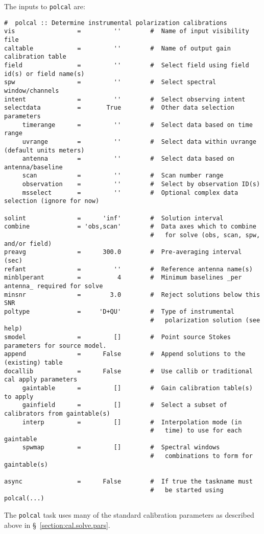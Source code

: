 The inputs to {\tt polcal} are:
\small
\begin{verbatim}
#  polcal :: Determine instrumental polarization calibrations
vis                 =         ''        #  Name of input visibility file
caltable            =         ''        #  Name of output gain calibration table
field               =         ''        #  Select field using field id(s) or field name(s)
spw                 =         ''        #  Select spectral window/channels
intent              =         ''        #  Select observing intent
selectdata          =       True        #  Other data selection parameters
     timerange      =         ''        #  Select data based on time range
     uvrange        =         ''        #  Select data within uvrange (default units meters)
     antenna        =         ''        #  Select data based on antenna/baseline
     scan           =         ''        #  Scan number range
     observation    =         ''        #  Select by observation ID(s)
     msselect       =         ''        #  Optional complex data selection (ignore for now)

solint              =      'inf'        #  Solution interval
combine             = 'obs,scan'        #  Data axes which to combine
                                        #   for solve (obs, scan, spw, and/or field)
preavg              =      300.0        #  Pre-averaging interval (sec)
refant              =         ''        #  Reference antenna name(s)
minblperant         =          4        #  Minimum baselines _per antenna_ required for solve
minsnr              =        3.0        #  Reject solutions below this SNR
poltype             =     'D+QU'        #  Type of instrumental
                                        #   polarization solution (see help)
smodel              =         []        #  Point source Stokes parameters for source model.
append              =      False        #  Append solutions to the (existing) table
docallib            =      False        #  Use callib or traditional cal apply parameters
     gaintable      =         []        #  Gain calibration table(s) to apply
     gainfield      =         []        #  Select a subset of calibrators from gaintable(s)
     interp         =         []        #  Interpolation mode (in
                                        #   time) to use for each gaintable
     spwmap         =         []        #  Spectral windows
                                        #   combinations to form for gaintable(s)

async               =      False        #  If true the taskname must
                                        #   be started using polcal(...)
\end{verbatim}
\normalsize
The {\tt polcal} task uses many of the standard calibration parameters
as described above in \S~\ref{section:cal.solve.pars}.

